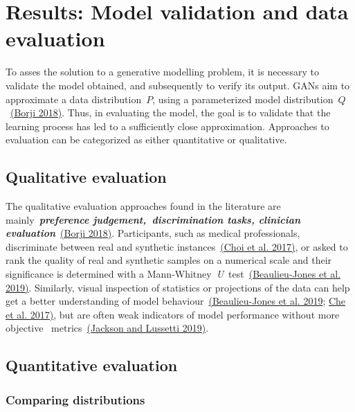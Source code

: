 \documentclass[10pt]{article}
\begin{document}
\section{Results: Model validation and data
evaluation}

{\label{182099}}

To asses the solution to a generative modelling problem, it is necessary
to validate the model obtained, and subsequently to verify its output.
GANs aim to approximate a data distribution~\(P\), using a
parameterized model distribution~\(Q\)~\hyperref[csl:52]{(Borji 2018)}.
Thus, in evaluating the model, the goal is to validate that the learning
process has led to a sufficiently close approximation. Approaches to
evaluation can be categorized as either quantitative or qualitative.~

\subsection{Qualitative evaluation}

{\label{671767}}

The qualitative evaluation approaches found in the literature are
mainly~\emph{\textbf{preference
judgement,~}}\textbf{\emph{discrimination tasks, clinician
evaluation}}~\hyperref[csl:52]{(Borji 2018)}. Participants, such as medical
professionals, discriminate between real and synthetic
instances~\hyperref[csl:31]{(Choi et al. 2017)}, or asked to rank the quality of real and
synthetic samples on a numerical scale and their significance is
determined with a Mann-Whitney~\emph{U}~test~\hyperref[csl:16]{(Beaulieu-Jones et al. 2019)}.
Similarly, visual inspection of statistics or projections of the data
can help get a better understanding of model
behaviour~\hyperref[csl:16]{(Beaulieu-Jones et al. 2019}; \hyperref[csl:15]{Che et al. 2017)}, but are often weak indicators of model
performance without more objective~ metrics~\hyperref[csl:23]{(Jackson and Lussetti 2019)}.~

\subsection{Quantitative evaluation}

{\label{695380}}

\subsubsection{Comparing distributions}

{\label{897626}}
\end{document}

